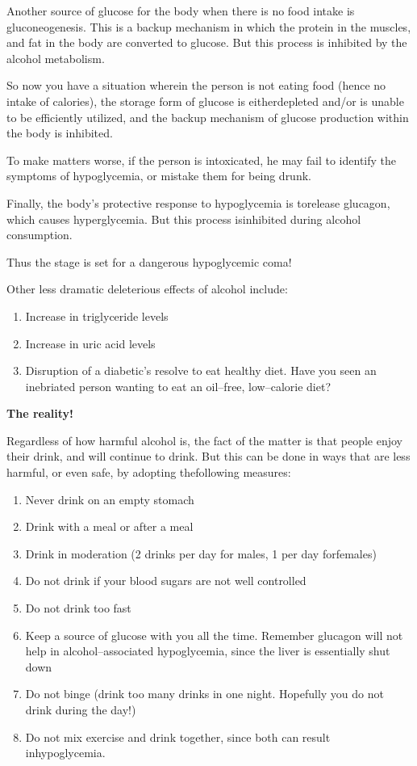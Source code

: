 Another source of glucose for the body when there is no food intake is gluconeogenesis. This is a backup mechanism in which the protein in the muscles, and fat in the body are converted to glucose. But this process is inhibited by the alcohol metabolism.

So now you have a situation wherein the person is not eating food (hence no intake of calories), the storage form of glucose is either\break depleted and/or is unable to be efficiently utilized, and the backup mechanism of glucose production within the body is inhibited.

To make matters worse, if the person is intoxicated, he may fail to identify the symptoms of hypoglycemia, or mistake them for being drunk.

Finally, the body’s protective response to hypoglycemia is to\break release glucagon, which causes hyperglycemia. But this process is\break inhibited during alcohol consumption.

Thus the stage is set for a dangerous hypoglycemic coma!

\noindent Other less dramatic deleterious effects of alcohol include:
\begin{enumerate}[•]
\itemsep=0pt
\item Increase in triglyceride levels
\item Increase in uric acid levels
\item Disruption of a diabetic’s resolve to eat healthy diet. Have you seen an inebriated person wanting to eat an oil–free, low–calorie diet?
\end{enumerate}

\noindent\textbf{The reality!}

Regardless of how harmful alcohol is, the fact of the matter is that people enjoy their drink, and will continue to drink. But this can be done in ways that are less harmful, or even safe, by adopting the\break following measures:
\begin{enumerate}[•]
\itemsep=0pt
\item Never drink on an empty stomach
\item Drink with a meal or after a meal
\item Drink in moderation (2 drinks per day for males, 1 per day for\break females)
\item Do not drink if your blood sugars are not well controlled
\item Do not drink too fast
\item Keep a source of glucose with you all the time. Remember glucagon will not help in alcohol–associated hypoglycemia, since the liver is essentially shut down
\item Do not binge (drink too many drinks in one night. Hopefully you do not drink during the day!)
\item Do not mix exercise and drink together, since both can result in\break hypoglycemia.
\end{enumerate}

